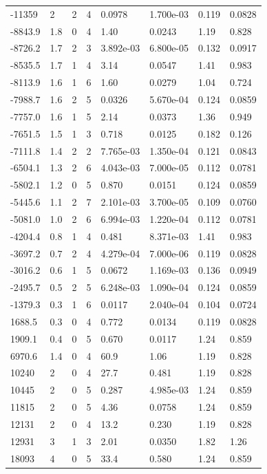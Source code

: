 \documentclass[preview]{standalone}
\begin{document}
{{\begin{tabular}{L{1.2cm}C{1.2cm} C{0.3cm}C{0.5cm} C{1.4cm}C{1.4cm} C{1.4cm}C{1.4cm}}
  -11359  &     2  & 2     &  4 &  0.0978  & 1.700e-03  & 0.119 &  0.0828   \\ 
  -8843.9  &   1.8  & 0     &  4 &  1.40  & 0.0243  & 1.19 &  0.828   \\ 
  -8726.2  &   1.7  & 2     &  3 &  3.892e-03  & 6.800e-05  & 0.132 &  0.0917   \\ 
  -8535.5  &   1.7  & 1     &  4 &  3.14  & 0.0547  & 1.41 &  0.983   \\ 
  -8113.9  &   1.6  & 1     &  6 &  1.60  & 0.0279  & 1.04 &  0.724   \\ 
  -7988.7  &   1.6  & 2     &  5 &  0.0326  & 5.670e-04  & 0.124 &  0.0859   \\ 
  -7757.0  &   1.6  & 1     &  5 &  2.14  & 0.0373  & 1.36 &  0.949   \\ 
  -7651.5  &   1.5  & 1     &  3 &  0.718  & 0.0125  & 0.182 &  0.126   \\ 
  -7111.8  &   1.4  & 2     &  2 &  7.765e-03  & 1.350e-04  & 0.121 &  0.0843   \\ 
  -6504.1  &   1.3  & 2     &  6 &  4.043e-03  & 7.000e-05  & 0.112 &  0.0781   \\ 
  -5802.1  &   1.2  & 0     &  5 &  0.870  & 0.0151  & 0.124 &  0.0859   \\ 
  -5445.6  &   1.1  & 2     &  7 &  2.101e-03  & 3.700e-05  & 0.109 &  0.0760   \\ 
  -5081.0  &   1.0  & 2     &  6 &  6.994e-03  & 1.220e-04  & 0.112 &  0.0781   \\ 
  -4204.4  &   0.8  & 1     &  4 &  0.481  & 8.371e-03  & 1.41 &  0.983   \\ 
  -3697.2  &   0.7  & 2     &  4 &  4.279e-04  & 7.000e-06  & 0.119 &  0.0828   \\ 
  -3016.2  &   0.6  & 1     &  5 &  0.0672  & 1.169e-03  & 0.136 &  0.0949   \\ 
  -2495.7  &   0.5  & 2     &  5 &  6.248e-03  & 1.090e-04  & 0.124 &  0.0859   \\ 
  -1379.3  &   0.3  & 1     &  6 &  0.0117  & 2.040e-04  & 0.104 &  0.0724   \\ 
  1688.5  &   0.3  & 0     &  4 &  0.772  & 0.0134  & 0.119 &  0.0828   \\ 
  1909.1  &   0.4  & 0     &  5 &  0.670  & 0.0117  & 1.24 &  0.859   \\ 
  6970.6  &   1.4  & 0     &  4 &  60.9  & 1.06  & 1.19 &  0.828   \\ 
  10240  &     2  & 0     &  4 &  27.7  & 0.481  & 1.19 &  0.828   \\ 
  10445  &     2  & 0     &  5 &  0.287  & 4.985e-03  & 1.24 &  0.859   \\ 
  11815  &     2  & 0     &  5 &  4.36  & 0.0758  & 1.24 &  0.859   \\ 
  12131  &     2  & 0     &  4 &  13.2  & 0.230  & 1.19 &  0.828   \\ 
  12931  &     3  & 1     &  3 &  2.01  & 0.0350  & 1.82 &  1.26   \\ 
  18093  &     4  & 0     &  5 &  33.4  & 0.580  & 1.24 &  0.859   \\ 
\hline 
\end{tabular} 

}}
\end{document}
